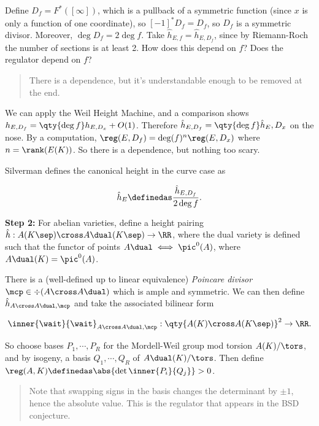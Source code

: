 Define \(D_f = F^*([\infty])\), which is a pullback of a symmetric
function (since \(x\) is only a function of one coordinate), so
\([-1]^* D_f = D_f\), so \(D_f\) is a symmetric divisor. Moreover,
\(\deg D_f = 2\deg f\). Take \(\hat h_{E, f} = \hat h_{E, D_f}\), since
by Riemann-Roch the number of sections is at least 2. How does this
depend on \(f\)? Does the regulator depend on \(f\)?

\begin{quote}
There is a dependence, but it's understandable enough to be removed at
the end.
\end{quote}

We can apply the Weil Height Machine, and a comparison shows
\(h_{E, D_f} = \qty{\deg f} h_{E, D_x} + O(1)\). Therefore
\(\hat h_{E, D_f} = \qty{\deg f} \hat h_E, D_x\) on the nose. By a
computation, \(\reg(E, D_f) = \deg(f)^{n} \reg(E, D_x)\) where
\(n = \rank(E(K))\). So there is a dependence, but nothing too scary.

Silverman defines the canonical height in the curve case as

\begin{align*}
\hat h_E \definedas \frac{\hat h_{E, D_f}}{2\deg f}
.\end{align*}

\textbf{Step 2:} For abelian varieties, define a height pairing
\(\hat h: A(K\sep) \cross A\dual(K\sep) \to \RR\), where the dual
variety is defined such that the functor of points
\(A\dual \iff \pic^0(A)\), where \(A\dual(K) = \pic^0(A)\).

There is a (well-defined up to linear equivalence) \emph{Poincare
divisor} \(\mcp \in \div(A\cross A\dual)\) which is ample and symmetric.
We can then define \(\hat h_{A\cross A\dual, \mcp}\) and take the
associated bilinear form

\begin{align*}
\inner{\wait}{\wait}_{A\cross A\dual, \mcp}:\qty{A(K) \cross A(K\sep)}^2 \to \RR
.\end{align*}

So choose bases \(P_1, \cdots, P_R\) for the Mordell-Weil group mod
torsion \(A(K)/\tors\), and by isogeny, a basis \(Q_1, \cdots, Q_R\) of
\(A\dual(K)/\tors\). Then define
\(\reg(A, K) \definedas \abs{\det{\inner{P_i}{Q_j}}} > 0\).

\begin{quote}
Note that swapping signs in the basis changes the determinant by
\(\pm 1\), hence the absolute value. This is the regulator that appears
in the BSD conjecture.
\end{quote}

